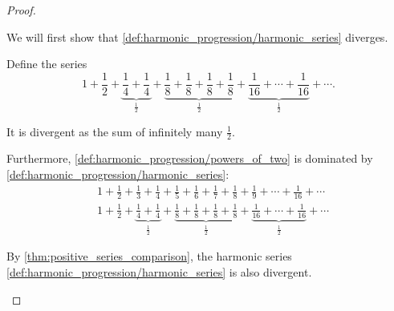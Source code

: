 \begin{proof}
  \begin{description}
     We will first show that \cref{def:harmonic_progression/harmonic_series} diverges.

    Define the series
    \begin{equation}\label{def:harmonic_progression/powers_of_two}
      1 + \frac 1 2 + \underbrace{\frac 1 4 + \frac 1 4}_{\tfrac 1 2} + \underbrace{\frac 1 8 + \frac 1 8 + \frac 1 8 + \frac 1 8}_{\tfrac 1 2} + \underbrace{\frac 1 {16} + \cdots + \frac 1 {16}}_{\tfrac 1 2} + \cdots.
    \end{equation}

    It is divergent as the sum of infinitely many \( \frac 1 2 \).

    Furthermore, \cref{def:harmonic_progression/powers_of_two} is dominated by \cref{def:harmonic_progression/harmonic_series}:
    \begin{align*}
      &1 + \frac 1 2 + \frac 1 3 + \frac 1 4 + \frac 1 5 + \frac 1 6 + \frac 1 7 + \frac 1 8 + \frac 1 9 + \cdots + \frac 1 {16} + \cdots
      \\
      &1 + \frac 1 2 + \underbrace{\frac 1 4 + \frac 1 4}_{\tfrac 1 2} + \underbrace{\frac 1 8 + \frac 1 8 + \frac 1 8 + \frac 1 8}_{\tfrac 1 2} + \underbrace{\frac 1 {16} + \cdots + \frac 1 {16}}_{\tfrac 1 2} + \cdots
    \end{align*}

    By \cref{thm:positive_series_comparison}, the harmonic series \cref{def:harmonic_progression/harmonic_series} is also divergent.
  \end{description}
\end{proof}
